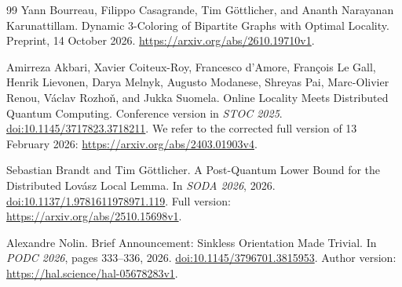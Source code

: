 \documentclass[11pt]{article}
\theoremstyle{definition}
\begin{document}
\begin{thebibliography}{99}
Yann Bourreau, Filippo Casagrande, Tim G\"ottlicher, and
Ananth Narayanan Karunattillam.
\newblock Dynamic 3-Coloring of Bipartite Graphs with Optimal Locality.
\newblock Preprint, 14 October 2026.
\newblock \url{https://arxiv.org/abs/2610.19710v1}.

Amirreza Akbari, Xavier Coiteux-Roy, Francesco d'Amore, Fran\c{c}ois Le Gall,
Henrik Lievonen, Darya Melnyk, Augusto Modanese, Shreyas Pai,
Marc-Olivier Renou, V\'aclav Rozho\v{n}, and Jukka Suomela.
\newblock Online Locality Meets Distributed Quantum Computing.
\newblock Conference version in \emph{STOC 2025}.
\newblock \href{https://doi.org/10.1145/3717823.3718211}{doi:10.1145/3717823.3718211}.
\newblock We refer to the corrected full version of 13 February 2026:
\url{https://arxiv.org/abs/2403.01903v4}.

Sebastian Brandt and Tim G\"ottlicher.
\newblock A Post-Quantum Lower Bound for the Distributed Lov\'asz Local Lemma.
\newblock In \emph{SODA 2026}, 2026.
\newblock \href{https://doi.org/10.1137/1.9781611978971.119}{doi:10.1137/1.9781611978971.119}.
\newblock Full version: \url{https://arxiv.org/abs/2510.15698v1}.

Alexandre Nolin.
\newblock Brief Announcement: Sinkless Orientation Made Trivial.
\newblock In \emph{PODC 2026}, pages 333--336, 2026.
\newblock \href{https://doi.org/10.1145/3796701.3815953}{doi:10.1145/3796701.3815953}.
\newblock Author version: \url{https://hal.science/hal-05678283v1}.
\end{thebibliography}
\end{document}
